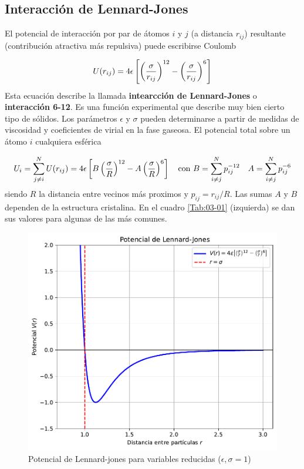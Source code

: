 \subsection{Interacción de Lennard-Jones}


El potencial de interacción por par de átomos $i$ y $j$ (a distancia $r_{ij}$) resultante (contribución atractiva más repulsiva) puede escribirse Coulomb

\begin{equation}
    U (r_{ij}) = 4 \epsilon \left[ \left( \frac{\sigma}{r_{ij}} \right)^{12}-\left( \frac{\sigma}{r_{ij}} \right)^6 \right]
\end{equation}
Esta ecuación describe la llamada \textbf{intearcción de Lennard-Jones} o  \textbf{interacción 6-12}. Es una función experimental que describe muy bien cierto tipo de sólidos. Los parámetros $\epsilon$ y $\sigma$ pueden determinarse a partir de medidas de viscosidad y coeficientes de virial en la fase gaseosa. El potencial total sobre un átomo $i$ cualquiera esférica

\begin{equation}
    U_i = \sum_{j\neq i}^N U(r_{ij}) = 4 \epsilon \left[ B \left( \frac{\sigma}{R} \right)^{12}-A\left( \frac{\sigma}{R} \right)^6 \right] \quad \text{con} \ B = \sum_{i\neq j}^N p_{ij}^{-12} \quad A = \sum_{i\neq j}^N p_{ij}^{-6} 
\end{equation}
siendo $R$ la distancia entre vecinos más proximos y $p_{ij}=r_{ij}/R$. Las sumas $A$ y $B$ dependen de la estructura cristalina. En el cuadro \ref{Tab:03-01} (izquierda) se dan sus valores para algunas de las más comunes.

\begin{figure}[h!] \centering
    \includegraphics[scale=1.05]{Cuerpo/Ch_03/Lennard-jones.pdf}
    \caption{Potencial de Lennard-jones para variables reducidas ($\epsilon,\sigma = 1$)}
    \label{Fig:03-03}
\end{figure}    

